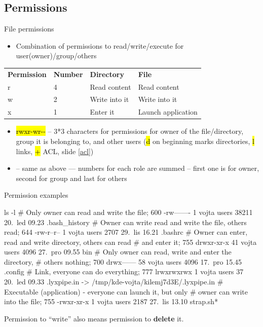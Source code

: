 \documentclass[compress, ucs, xelatex, 11pt, xcolor=svgnames,
  hyperref={
    bookmarks=true,
    unicode=true,
    colorlinks=true,
    pdftitle={Linux, command line and MetaCentrum},
    plainpages=false,
    pdfauthor={Vojtech Zeisek},
    pdfsubject={Course about use of Linux command line, writing shell scripts and using MetaCentrum of CESNET},
    pdfcreator={XeLaTeX},
    pdfkeywords={Linux, GNU, BASH, shell, command line, MetaCentrum},
    linkcolor=Red,
    anchorcolor=Blue,
    citecolor=Purple,
    filecolor=DodgerBlue,
    menucolor=DarkOrchid,
    urlcolor=DeepSkyBlue,
    pdftex},
  url={hyphens, lowtilde} %
  ]{beamer}
\renewcommand{\texttt}[1]{\hl{\ttfamily #1}}
\begin{document}
\subsection{Permissions}

\begin{frame}{File permissions}
\begin{itemize}
  \item Combination of permissions to read/write/execute for user(owner)/group/others
\end{itemize}
\begin{center}
\begin{tabular}{llll}
\textbf{Permission} & \textbf{Number} & \textbf{Directory} & \textbf{File}\\
r & 4 & Read content & Read content\\
w & 2 & Write into it & Write into it\\
x & 1 & Enter it & Launch application \\
\end{tabular}
\end{center}
\begin{itemize}
  \item \texttt{rwxr-wr{-}-} -- 3*3 characters for permissions for owner of the file/directory, group it is belonging to, and other users (\texttt{d} on beginning marks directories, \texttt{l} links, \texttt{+} ACL, slide \ref{acl})
  \item \texttt{764} -- same as above --- numbers for each role are summed -- first one is for owner, second for group and last for others
\end{itemize}
\end{frame}

\begin{frame}[fragile]{Permission examples}
\begin{bashcode}
    ls -l
    # Only owner can read and write the file; 600
    -rw-------   1 vojta users   38211 20. led 09.23 .bash_history
    # Owner can write read and write the file, others read; 644
    -rw-r--r--   1 vojta users    2707 29. lis 16.21 .bashrc
    # Owner can enter, read and write directory, others can read
    # and enter it; 755
    drwxr-xr-x  41 vojta users    4096 27. pro 09.55 bin
    # Only owner can read, write and enter the directory,
    # others nothing; 700
    drwx------  58 vojta users    4096 17. pro 15.45 .config
    # Link, everyone can do everything; 777
    lrwxrwxrwx   1 vojta users      37 20. led 09.33 .lyxpipe.in ->
      /tmp/kde-vojta/kilemj7d3E/.lyxpipe.in
    # Executable (application) - everyone can launch it, but only
    # owner can write into the file; 755
    -rwxr-xr-x   1 vojta users    2187 27. lis 13.10 strap.sh*
\end{bashcode}
\vfil
Permission to ``write'' also means permission to \textbf{delete} it.
\end{frame}
\end{document}
